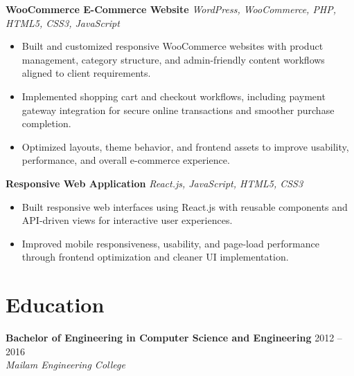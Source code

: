 \documentclass[12pt,a4paper]{article}
\newcommand{\resumeSubheading}[4]{
  \vspace{2pt}
  \textbf{#1} \hfill #2 \\
  \textit{#3} \hfill \textit{#4} \\
}
\newcommand{\resumeProjectHeading}[2]{
  \vspace{2pt}
  \textbf{#1} \hfill \textit{#2} \\
}
\begin{document}
\resumeProjectHeading{WooCommerce E-Commerce Website}{WordPress, WooCommerce, PHP, HTML5, CSS3, JavaScript}
\begin{itemize}[leftmargin=1.2em,itemsep=4pt,topsep=4pt]
    \item Built and customized responsive WooCommerce websites with product management, category structure, and admin-friendly content workflows aligned to client requirements.
    \item Implemented shopping cart and checkout workflows, including payment gateway integration for secure online transactions and smoother purchase completion.
    \item Optimized layouts, theme behavior, and frontend assets to improve usability, performance, and overall e-commerce experience.
\end{itemize}

\resumeProjectHeading{Responsive Web Application}{React.js, JavaScript, HTML5, CSS3}
\begin{itemize}[leftmargin=1.2em,itemsep=4pt,topsep=4pt]
    \item Built responsive web interfaces using React.js with reusable components and API-driven views for interactive user experiences.
    \item Improved mobile responsiveness, usability, and page-load performance through frontend optimization and cleaner UI implementation.
\end{itemize}

\section*{Education}
\resumeSubheading{Bachelor of Engineering in Computer Science and Engineering}{2012 -- 2016}{Mailam Engineering College}{}
\end{document}
